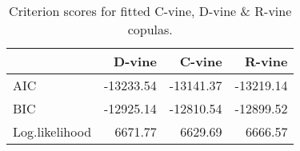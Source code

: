 \begin{table}[H]

\caption{Criterion scores for fitted C-vine, D-vine \& R-vine copulas.}
\centering
\fontsize{11}{13}\selectfont
\begin{tabular}[t]{lrrr}
\toprule
 & D-vine & C-vine & R-vine\\
\midrule
AIC & -13233.54 & -13141.37 & -13219.14\\
BIC & -12925.14 & -12810.54 & -12899.52\\
Log.likelihood & 6671.77 & 6629.69 & 6666.57\\
\bottomrule
\end{tabular}
\end{table}
